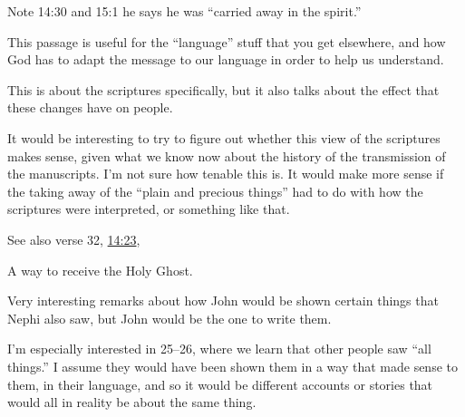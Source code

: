 \begin{compactdesc}
\begin{compactitem}
					\item Note 14:30 and 15:1 he says he was ``carried away in the spirit.''
				\end{compactitem}
			\item[{\hyperref[1NEPHI-11-11]{1 Nephi 11:11}}] \phantom{.}	
				\begin{compactitem}
					\item This passage is useful for the ``language'' stuff that you get elsewhere, and how God has to adapt the message to our language in order to help us understand.
				\end{compactitem}
			\item[{\hyperref[1NEPHI-13-23]{1 Nephi 13:23--29}}] \phantom{.}
				\begin{compactitem}
					\item This is about the scriptures specifically, but it also talks about the effect that these changes have on people.
					\item It would be interesting to try to figure out whether this view of the scriptures makes sense, given what we know now about the history of the transmission of the manuscripts. I'm not sure how tenable this is. It would make more sense if the taking away of the ``plain and precious things'' had to do with how the scriptures were interpreted, or something like that.
					\item See also verse 32, \hyperref[1NEPHI-14-23]{14:23}, 
				\end{compactitem} 
			\item[{\hyperref[1NEPHI-13-37]{1 Nephi 13:37}}] \phantom{.}
				\begin{compactitem}
					\item A way to receive the Holy Ghost.
				\end{compactitem}
			\item[{\hyperref[1NEPHI-14-18]{1 Nephi 14:18--30}}] \phantom{.}
				\begin{compactitem}
					\item Very interesting remarks about how John would be shown certain things that Nephi also saw, but John would be the one to write them.
					\item I'm especially interested in 25--26, where we learn that other people saw ``all things.'' I assume they would have been shown them in a way that made sense to them, in their language, and so it would be different accounts or stories that would all in reality be about the same thing.
				\end{compactitem}

\end{compactdesc}
